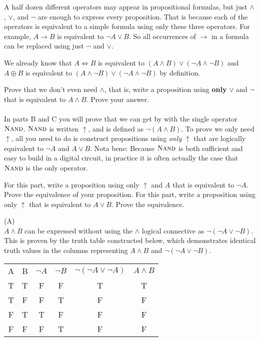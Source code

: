 \documentclass[solution,letterpaper]{cs20}
\begin{document}


\begin{problem}
A half dozen different operators may appear in propositional formulas, but just
$\wedge$, $\vee$, and $\neg$ are enough to express every proposition. That is because each of the operators
is equivalent to a simple formula using only these three operators. For example,
$A \rightarrow B$ is equivalent to $\neg A \vee B$. So all occurrences of $\rightarrow$ in a
formula can be replaced using just $\neg$ and $\vee$.

We already know that $A \iff B$ is equivalent to $(A \land B) \lor (\neg A \land \neg B)$ and $A \oplus B$ is equivalent to $(A \land \neg B) \lor (\neg A \land \neg B)$ by definition. 

\subproblem Prove that we don’t even need $\wedge$, that is, write a proposition using {\bf only} $\vee$ and $\neg$ that is equivalent to $A \wedge B$. Prove your answer. \\ \\
In parts B and C you will prove that we can get by with the single operator $\textsc{Nand}$. $\textsc{Nand}$ is written $\uparrow$, and is defined as $\neg(A \wedge B)$. To prove we only need $\uparrow$, all you need to do is construct propositions using \emph{only} $\uparrow$ that are logically equivalent to $\neg A$ and $A \vee B$. Nota bene: Because $\textsc{Nand}$ is both sufficient and easy to build in a digital circuit, in practice it is often actually the case that $\textsc{Nand}$ is the only operator. 

\subproblem For this part, write a proposition using only $\uparrow$ and $A$ that is equivalent to $\neg A$. Prove the equivalence of your proposition. 
\subproblem For this part, write a proposition using only $\uparrow$ that is equivalent to $A \vee B$. Prove the equivalence. 


\begin{solution}
    (A) \\
    $A \land B$ can be expressed without using the $\land$ logical connective as $\neg (\neg A \lor \neg B)$. This is proven by the truth table constructed below, which demonstrates identical truth values in the columns representing $A \land B$ and $\neg (\neg A \lor \neg B)$.

    \begin{tabular}{c|c|c|c|c|c|}
        A & B & $\neg A$ & $\neg B$ & $\neg (\neg A \lor \neg A)$ & $A \land B$ \\
        T & T & F & F & T & T  \\
        T & F & F & T & F & F  \\
        F & T & T & F & F & F  \\ 
        F & F & F & T & F & F  \\
    \end{tabular}
    \label{tab:my_label} \\ 


\end{solution}
\end{problem}
\end{document}
